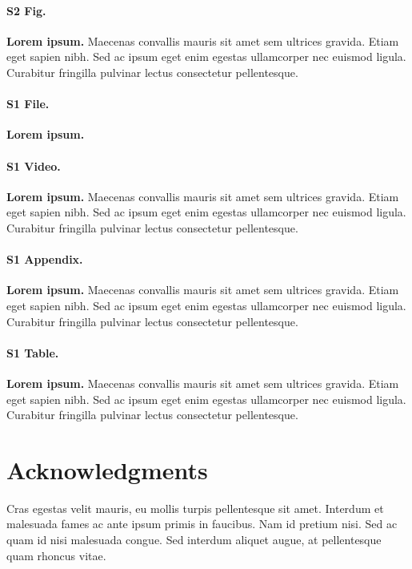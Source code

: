 \documentclass[
  10pt,
  letterpaper,
]{article}
\begin{document}
\paragraph*{S2 Fig.}
\label{s2-fig}
{\textbf{Lorem ipsum.}} Maecenas convallis mauris sit amet sem ultrices
gravida. Etiam eget sapien nibh. Sed ac ipsum eget enim egestas
ullamcorper nec euismod ligula. Curabitur fringilla pulvinar lectus
consectetur pellentesque.

\paragraph*{S1 File.}
\label{s1-file}
{\textbf{Lorem ipsum.}}

\paragraph*{S1 Video.}
\label{s1-video}
{\textbf{Lorem ipsum.}} Maecenas convallis mauris sit amet sem ultrices
gravida. Etiam eget sapien nibh. Sed ac ipsum eget enim egestas
ullamcorper nec euismod ligula. Curabitur fringilla pulvinar lectus
consectetur pellentesque.

\paragraph*{S1 Appendix.}
\label{s1-appendix}
{\textbf{Lorem ipsum.}} Maecenas convallis mauris sit amet sem ultrices
gravida. Etiam eget sapien nibh. Sed ac ipsum eget enim egestas
ullamcorper nec euismod ligula. Curabitur fringilla pulvinar lectus
consectetur pellentesque.

\paragraph*{S1 Table.}
\label{s1-table}
{\textbf{Lorem ipsum.}} Maecenas convallis mauris sit amet sem ultrices
gravida. Etiam eget sapien nibh. Sed ac ipsum eget enim egestas
ullamcorper nec euismod ligula. Curabitur fringilla pulvinar lectus
consectetur pellentesque.

\hypertarget{acknowledgments}{%
\section{Acknowledgments}\label{acknowledgments}}

Cras egestas velit mauris, eu mollis turpis pellentesque sit amet.
Interdum et malesuada fames ac ante ipsum primis in faucibus. Nam id
pretium nisi. Sed ac quam id nisi malesuada congue. Sed interdum aliquet
augue, at pellentesque quam rhoncus vitae.


\nolinenumbers
  
\end{document}
